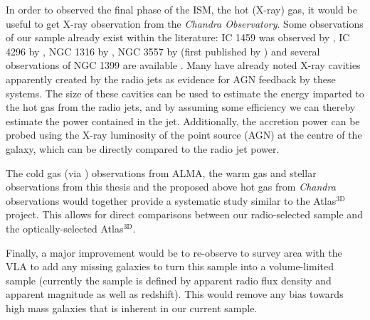 	In order to observed the final phase of the ISM, the hot (X-ray) gas, it would be useful to get X-ray observation from the \textit{Chandra Observatory}. Some observations of our sample already exist within the literature: IC 1459 was observed by \citet{Fabbiano2003}, IC 4296 by \citet{Pellegrini2002}, NGC 1316 by \citet{Lanz2010}, NGC 3557 by \citet{Ponman2001} (first published by \citealt{Balmaverde2005}) and several observations of NGC 1399 are available \citep[e.g.][]{Su2017}. Many have already noted X-ray cavities apparently created by the radio jets as evidence for AGN feedback by these systems. The size of these cavities can be used to estimate the energy imparted to the hot gas from the radio jets, and by assuming some efficiency we can thereby estimate the power contained in the jet. Additionally, the accretion power can be probed using the X-ray luminosity of the point source (AGN) at the centre of the galaxy, which can be directly compared to the radio jet power.

	The cold gas (via ) observations from ALMA, the warm gas and stellar observations from this thesis and the proposed above hot gas from \textit{Chandra} observations would together provide a systematic study similar to the Atlas$^\text{3D}$ project. This allows for direct comparisons between our radio-selected sample and the optically-selected Atlas$^\text{3D}$. 

	Finally, a major improvement would be to re-observe to survey area with the VLA to add any missing galaxies to turn this sample into a volume-limited sample (currently the sample is defined by apparent radio flux density and apparent magnitude as well as redshift). This would remove any bias towards high mass galaxies that is inherent in our current sample.
